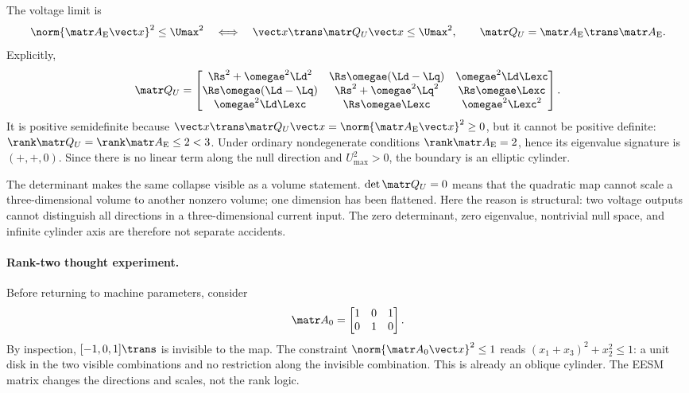 The voltage limit is
\begin{equation}
 \norm{\Ae\state}^2\leq\Umax^2
 \quad\Longleftrightarrow\quad
 \state\trans\Qu\state\leq\Umax^2,
 \qquad \Qu=\Ae\trans\Ae.\label{eq:eesm-voltage-quadratic}
\end{equation}
Explicitly,
\begin{equation}
\Qu=\begin{bmatrix}
\Rs^2+\omegae^2\Ld^2&\Rs\omegae(\Ld-\Lq)&\omegae^2\Ld\Lexc\\
\Rs\omegae(\Ld-\Lq)&\Rs^2+\omegae^2\Lq^2&\Rs\omegae\Lexc\\
\omegae^2\Ld\Lexc&\Rs\omegae\Lexc&\omegae^2\Lexc^2
\end{bmatrix}.\label{eq:Qu-explicit}
\end{equation}
It is positive semidefinite because
$\state\trans\Qu\state=\norm{\Ae\state}^2\geq0$, but it cannot be positive
definite: $\rank\Qu=\rank\Ae\leq2<3$.  Under ordinary nondegenerate conditions
$\rank\Ae=2$, hence its eigenvalue signature is $(+,+,0)$.  Since there is no
linear term along the null direction and $U_{\max}^2>0$, the boundary is an
elliptic cylinder.

The determinant makes the same collapse visible as a volume statement.
$\det\Qu=0$ means that the quadratic map cannot scale a three-dimensional
volume to another nonzero volume; one dimension has been flattened.  Here the
reason is structural: two voltage outputs cannot distinguish all directions
in a three-dimensional current input.  The zero determinant, zero eigenvalue,
nontrivial null space, and infinite cylinder axis are therefore not separate
accidents.

\paragraph{Rank-two thought experiment.}
Before returning to machine parameters, consider
\begin{equation}
 \matr A_0=\begin{bmatrix}1&0&1\\0&1&0\end{bmatrix}.
\end{equation}
By inspection, $[-1,0,1]\trans$ is invisible to the map.  The constraint
$\norm{\matr A_0\vect x}^2\leq1$ reads
$(x_1+x_3)^2+x_2^2\leq1$: a unit disk in the two visible combinations and no
restriction along the invisible combination.  This is already an oblique
cylinder.  The EESM matrix changes the directions and scales, not the rank
logic.

